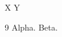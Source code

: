 \documentclass{article}
\begin{document}
{\let\cite\undefined X\cite{a}} Y\cite{b}

\begin{thebibliography}{9}
 Alpha.
 Beta.
\end{thebibliography}
\end{document}
